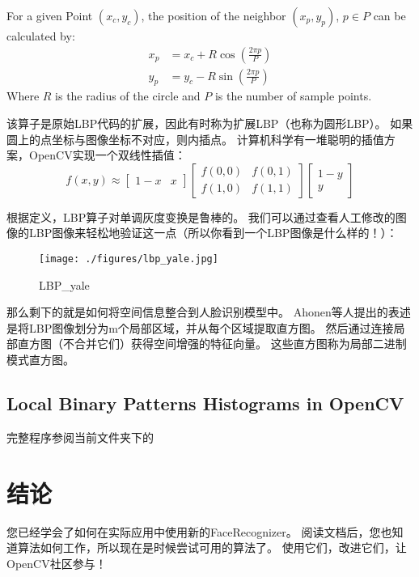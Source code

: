 \documentclass[UTF8]{ctexart}
\begin{document}
 For a given Point $(x_c, y_c)$, the position of the neighbor $(x_p, y_p)$, $p \in P$ can be calculated by:
\begin{align}
	x_p &= x_c + R \cos(\frac{2\pi p}{P})		\\
	y_p &= y_c - R \sin(\frac{2\pi p}{P})
\end{align}
Where $R$ is the radius of the circle and $P$ is the number of sample points.

该算子是原始LBP代码的扩展，因此有时称为扩展LBP（也称为圆形LBP）。 如果圆上的点坐标与图像坐标不对应，则内插点。 计算机科学有一堆聪明的插值方案，OpenCV实现一个双线性插值：
\begin{equation}
	f(x, y) \approx \begin{bmatrix} 1 - x & x \end{bmatrix} \begin{bmatrix} f(0, 0) & f(0, 1) \\ f(1, 0) & f(1, 1) \end{bmatrix} \begin{bmatrix} 1-y \\ y \end{bmatrix}
\end{equation}

根据定义，LBP算子对单调灰度变换是鲁棒的。 我们可以通过查看人工修改的图像的LBP图像来轻松地验证这一点（所以你看到一个LBP图像是什么样的！）：
\begin{figure}[htbp]
	\centerline{\texttt{[image: ./figures/lbp\_yale.jpg]}}
	\caption{LBP\_yale}
\end{figure}

那么剩下的就是如何将空间信息整合到人脸识别模型中。 Ahonen等人提出的表述\cite{Ahonen2004}是将LBP图像划分为m个局部区域，并从每个区域提取直方图。 然后通过连接局部直方图（不合并它们）获得空间增强的特征向量。 这些直方图称为局部二进制模式直方图。

\subsection{Local Binary Patterns Histograms in OpenCV}
完整程序参阅当前文件夹下的\;{\color{blue}{src/facerec\_lbph.cpp}}

\section{结论}
您已经学会了如何在实际应用中使用新的FaceRecognizer。 阅读文档后，您也知道算法如何工作，所以现在是时候尝试可用的算法了。 使用它们，改进它们，让OpenCV社区参与！
\end{document}

